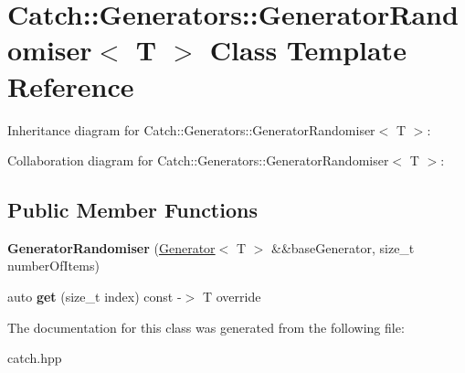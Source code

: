 \hypertarget{classCatch_1_1Generators_1_1GeneratorRandomiser}{}\section{Catch\+:\+:Generators\+:\+:Generator\+Randomiser$<$ T $>$ Class Template Reference}
\label{classCatch_1_1Generators_1_1GeneratorRandomiser}


Inheritance diagram for Catch\+:\+:Generators\+:\+:Generator\+Randomiser$<$ T $>$\+:


Collaboration diagram for Catch\+:\+:Generators\+:\+:Generator\+Randomiser$<$ T $>$\+:
\subsection*{Public Member Functions}
\begin{DoxyCompactItemize}
\item 
{\bfseries Generator\+Randomiser} (\hyperlink{classCatch_1_1Generators_1_1Generator}{Generator}$<$ T $>$ \&\&base\+Generator, size\+\_\+t number\+Of\+Items)\hypertarget{classCatch_1_1Generators_1_1GeneratorRandomiser_aba3234a2885baff107766814d10c2efc}{}\label{classCatch_1_1Generators_1_1GeneratorRandomiser_aba3234a2885baff107766814d10c2efc}

\item 
auto {\bfseries get} (size\+\_\+t index) const -\/$>$ T override\hypertarget{classCatch_1_1Generators_1_1GeneratorRandomiser_a4ad5de15865727bdaa638863e0969ab4}{}\label{classCatch_1_1Generators_1_1GeneratorRandomiser_a4ad5de15865727bdaa638863e0969ab4}

\end{DoxyCompactItemize}


The documentation for this class was generated from the following file\+:\begin{DoxyCompactItemize}
\item 
catch.\+hpp\end{DoxyCompactItemize}
